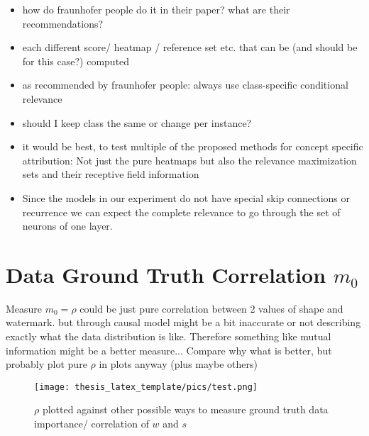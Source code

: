 \begin{itemize}
    \item how do fraunhofer people do it in their paper? what are their recommendations?
    \item each different score/ heatmap / reference set etc. that can be (and should be for this case?) computed
    \item as recommended by fraunhofer people: always use class-specific conditional relevance
    \item should I keep class the same or change per instance?
    \item it would be best, to test multiple of the proposed methods for concept specific attribution: Not just the pure heatmaps but also the relevance maximization sets and their receptive field information
    \item Since the models in our experiment do not have special skip connections or recurrence we can expect the complete relevance to go through the set of neurons of one layer. 
\end{itemize}

\section{Data Ground Truth Correlation $m_0$}
Measure $m_0 = \rho$ could be just pure correlation between 2 values of shape and watermark. but through causal model might be a bit inaccurate or not describing exactly what the data distribution is like. Therefore something like mutual information might be a better measure...
Compare why what is better, but probably plot pure $\rho$ in plots anyway (plus maybe others)

\begin{figure}
    \centering
    \texttt{[image: thesis\_latex\_template/pics/test.png]}
    \caption{$\rho$ plotted against other possible ways to measure ground truth data importance/ correlation of $w$ and $s$}
    \label{fig:finding_rho}
\end{figure}

